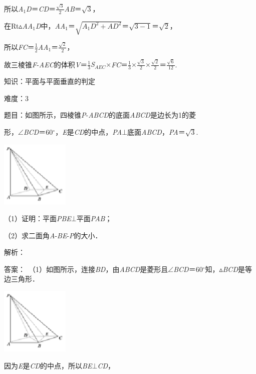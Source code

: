 \documentclass{article} %
\begin{document}
所以\textit{A}${}_{1}$\textit{D}＝\textit{CD}＝$\frac{\sqrt{3}}{2}$\textit{AB}＝$\sqrt{3}$，

在Rt$\mathrm{\vartriangle}$\textit{AA}${}_{1}$\textit{D}中，\textit{AA}${}_{1}$＝$\sqrt{A_1D^2+AD^2}$＝$\sqrt{3-1}$＝$\sqrt{2}$，

所以\textit{FC}＝$\frac{1}{2}$\textit{AA}${}_{1}$＝$\frac{\sqrt{2}}{2}$，

故三棱锥\textit{F}-\textit{AEC}的体积\textit{V}＝$\frac{1}{3}$\textit{S${}_{AEC}$}$\mathrm{\times}$\textit{FC}＝$\frac{1}{3}$$\mathrm{\times}$$\frac{\sqrt{3}}{2}$$\mathrm{\times}$$\frac{\sqrt{2}}{2}$＝$\frac{\sqrt{6}}{12}$.

知识：平面与平面垂直的判定

难度：3

题目：如图所示，四棱锥\textit{P}-\textit{ABCD}的底面\textit{ABCD}是边长为1的菱

形，$\mathrm{\angle}$\textit{BCD}＝60$\mathrm{{}^\circ}$，\textit{E}是\textit{CD}的中点，\textit{PA}$\mathrm{\bot}$底面\textit{ABCD}，\textit{PA}＝$\sqrt{3}$.

\includegraphics*[width=1.29in, height=1.25in, keepaspectratio=false]{image228}

（1）证明：平面\textit{PBE}$\mathrm{\bot}$平面\textit{PAB}；

（2）求二面角\textit{A}-\textit{BE}-\textit{P}的大小．

解析：

答案：　（1）如图所示，连接\textit{BD}，由\textit{ABCD}是菱形且$\mathrm{\angle}$\textit{BCD}＝60$\mathrm{{}^\circ}$知，$\mathrm{\vartriangle}$\textit{BCD}是等边三角形．

\includegraphics*[width=1.29in, height=1.25in, keepaspectratio=false]{image229}

因为\textit{E}是\textit{CD}的中点，所以\textit{BE}$\mathrm{\bot}$\textit{CD}，
\end{document}
